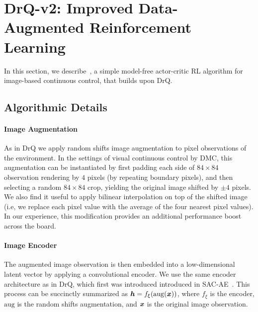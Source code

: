 \section{DrQ-v2: Improved Data-Augmented Reinforcement Learning}
\label{section:method}


\begin{algorithm*}[t!]

\caption{
\drqs: Improved data-augmented RL.
}



\label{alg:drqv2}
\end{algorithm*}


In this section, we describe~\drq, a simple model-free actor-critic RL algorithm for image-based continuous control, that builds upon DrQ. 

\subsection{Algorithmic Details}
\label{section:algo_details}
\paragraph{Image Augmentation} As in DrQ we apply random shifts image augmentation to pixel observations of the environment. In the settings of visual continuous control by DMC, this augmentation can be instantiated by first padding each side of $84 \times 84$ observation rendering by $4$ pixels (by repeating boundary pixels), and then selecting a random $84 \times 84$ crop, yielding the original image shifted by $\pm 4$ pixels. We also find it useful to apply bilinear interpolation on top of the shifted image (i.e, we replace each pixel value with the average of the four nearest pixel values). In our experience, this modification provides an additional performance boost across the board.
\paragraph{Image Encoder}
The augmented image observation is then embedded into a low-dimensional latent vector by applying a convolutional encoder. We use the same encoder architecture as in DrQ, which first was introduced introduced in SAC-AE~\citep{yarats2019improving}. This process can be succinctly summarized as ${\bm{h}} = f_\xi(\mathrm{aug}({\bm{x}}))$,
where $f_\xi$ is the encoder, $\mathrm{aug}$ is the random shifts augmentation, and ${\bm{x}}$ is the original image observation.

